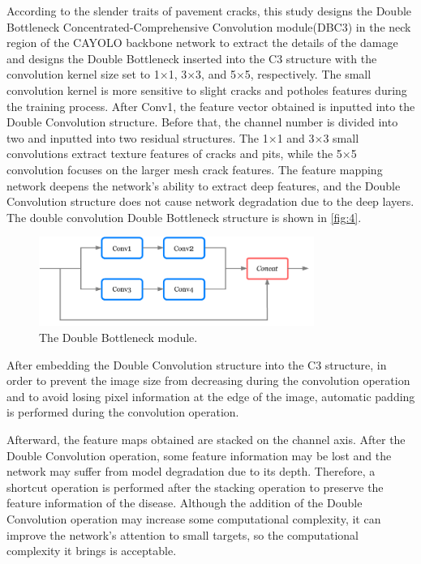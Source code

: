 \documentclass[sensors,article,submit,moreauthors]{Definitions/mdpi}
\begin{document}
    According to the slender traits of pavement cracks, this study designs the Double Bottleneck Concentrated-Comprehensive Convolution module(DBC3) in the neck region of the CAYOLO backbone network to extract the details of the damage and designs the Double Bottleneck inserted into the C3 structure with the convolution kernel size set to 1×1, 3×3, and 5×5, respectively. The small convolution kernel is more sensitive to slight cracks and potholes features during the training process. After Conv1, the feature vector obtained is inputted into the Double Convolution structure. Before that, the channel number is divided into two and inputted into two residual structures. The 1×1 and 3×3 small convolutions extract texture features of cracks and pits, while the 5×5 convolution focuses on the larger mesh crack features. The feature mapping network deepens the network's ability to extract deep features, and the Double Convolution structure does not cause network degradation due to the deep layers. The double convolution Double Bottleneck structure is shown in \autoref{fig:4}.

    \begin{figure}[H]
        \includegraphics[width=0.8\textwidth]{images/figure4}
        \caption{The Double Bottleneck module.\label{fig:4}}
    \end{figure}


    After embedding the Double Convolution structure into the C3 structure, in order to prevent the image size from decreasing during the convolution operation and to avoid losing pixel information at the edge of the image, automatic padding is performed during the convolution operation.

    Afterward, the feature maps obtained are stacked on the channel axis. After the Double Convolution operation, some feature information may be lost and the network may suffer from model degradation due to its depth. Therefore, a shortcut operation is performed after the stacking operation to preserve the feature information of the disease. Although the addition of the Double Convolution operation may increase some computational complexity, it can improve the network's attention to small targets, so the computational complexity it brings is acceptable.
\end{document}
